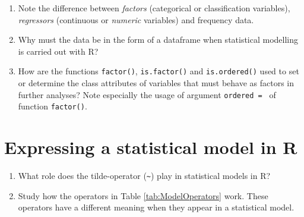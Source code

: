 \documentclass[
]{book}
\begin{document}
\begin{enumerate}
\def\labelenumi{(\alph{enumi})}
\item
  Note the difference between \emph{{factors}} (categorical or classification variables), \emph{{regressors}} (continuous or \emph{{numeric}} variables) and frequency data.
\item
  Why must the data be in the form of a dataframe when statistical modelling is carried out with R?
\item
  How are the functions \texttt{factor()}, \texttt{is.factor()} and \texttt{is.ordered()} used to set or determine the class attributes of variables that must behave as factors in further analyses? Note especially the usage of argument \texttt{\textquotesingle{}ordered\ =\ \textquotesingle{}} of function \texttt{factor()}.
\end{enumerate}

\section{Expressing a statistical model in R}\label{expressing-a-statistical-model-in-r}

\begin{enumerate}
\def\labelenumi{(\alph{enumi})}
\item
  What role does the tilde-operator (\texttt{\textasciitilde{}}) play in statistical models in R?
\item
  Study how the operators in Table \ref{tab:ModelOperators} work. These operators have a different meaning when they appear in a statistical model.
\end{enumerate}
\end{document}
